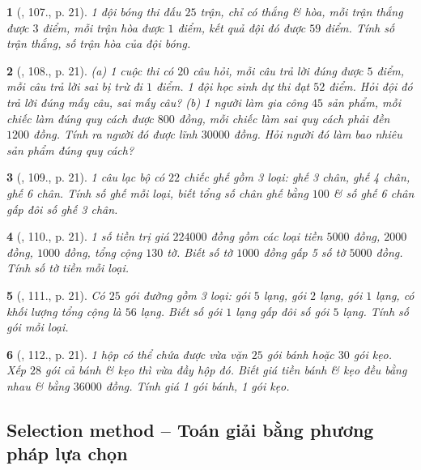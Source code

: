 \documentclass{article}
\newtheorem{baitoan}{}
\begin{document}
\begin{baitoan}[\cite{Binh_Toan_6_tap_1}, 107., p. 21]
	1 đội bóng thi đấu $25$ trận, chỉ có thắng \& hòa, mỗi trận thắng được $3$ điểm, mỗi trận hòa được $1$ điểm, kết quả đội đó được $59$ điểm. Tính số trận thắng, số trận hòa của đội bóng.
\end{baitoan}

\begin{baitoan}[\cite{Binh_Toan_6_tap_1}, 108., p. 21]
	(a) 1 cuộc thi có $20$ câu hỏi, mỗi câu trả lời đúng được $5$ điểm, mỗi câu trả lời sai bị trừ đi $1$ điểm. 1 đội học sinh dự thi đạt $52$ điểm. Hỏi đội đó trả lời đúng mấy câu, sai mấy câu? (b) 1 người làm gia công $45$ sản phẩm, mỗi chiếc làm đúng quy cách được $800$ đồng, mỗi chiếc làm sai quy cách phải đền $1200$ đồng. Tính ra người đó được lĩnh $30000$ đồng. Hỏi người đó làm bao nhiêu sản phẩm đúng quy cách?
\end{baitoan}

\begin{baitoan}[\cite{Binh_Toan_6_tap_1}, 109., p. 21]
	1 câu lạc bộ có $22$ chiếc ghế gồm 3 loại: ghế 3 chân, ghế 4 chân, ghế 6 chân. Tính số ghế mỗi loại, biết tổng số chân ghế bằng $100$ \& số ghế 6 chân gấp đôi số ghế 3 chân.
\end{baitoan}

\begin{baitoan}[\cite{Binh_Toan_6_tap_1}, 110., p. 21]
	1 số tiền trị giá $224000$ đồng gồm các loại tiền $5000$ đồng, $2000$ đồng, $1000$ đồng, tổng cộng $130$ tờ. Biết số tờ $1000$ đồng gấp 5 số tờ $5000$ đồng. Tính số tờ tiền mỗi loại.
\end{baitoan}

\begin{baitoan}[\cite{Binh_Toan_6_tap_1}, 111., p. 21]
	Có $25$ gói đường gồm 3 loại: gói $5$ lạng, gói $2$ lạng, gói $1$ lạng, có khối lượng tổng cộng là $56$ lạng. Biết số gói $1$ lạng gấp đôi số gói $5$ lạng. Tính số gói mỗi loại.
\end{baitoan}

\begin{baitoan}[\cite{Binh_Toan_6_tap_1}, 112., p. 21]
	1 hộp có thể chứa được vừa vặn $25$ gói bánh hoặc $30$ gói kẹo. Xếp $28$ gói cả bánh \& kẹo thì vừa đầy hộp đó. Biết giá tiền bánh \& kẹo đều bằng nhau \& bằng $36000$ đồng. Tính giá 1 gói bánh, 1 gói kẹo.
\end{baitoan}

\subsection{Selection method -- Toán giải bằng phương pháp lựa chọn}
\end{document}
